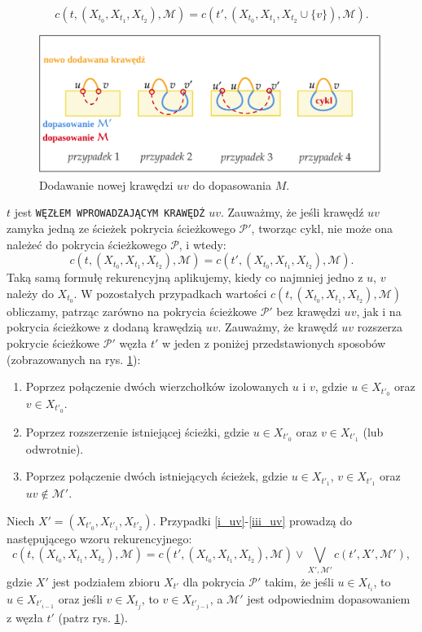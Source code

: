 \documentclass[12pt, oneside]{report}
\begin{document}
$$c(t, (X_{t_0}, X_{t_1}, X_{t_2}), \mathcal{M}) = c(t', (X_{t_0}, X_{t_1}, X_{t_2} \cup \{v\}), \mathcal{M}).$$
\begin{figure}
\centering
\includegraphics[width=16cm]{introduce_edge.png}
\caption{Dodawanie nowej krawędzi $uv$ do dopasowania $M$.}
\label{introduce_edge}
\end{figure}
$t$ jest \texttt{WĘZŁEM WPROWADZAJĄCYM KRAWĘDŹ} $uv$. Zauważmy, że jeśli krawędź $uv$ zamyka jedną ze ścieżek pokrycia ścieżkowego $\mathcal{P}'$, tworząc cykl, nie może ona należeć do pokrycia ścieżkowego $\mathcal{P}$, i wtedy:
$$c(t, (X_{t_0}, X_{t_1}, X_{t_2}), \mathcal{M}) = c(t', (X_{t_0}, X_{t_1}, X_{t_2}), \mathcal{M}).$$
Taką samą formułę rekurencyjną aplikujemy, kiedy co najmniej jedno z $u$, $v$ należy do $X_{t_0}$.  W pozostałych przypadkach wartości $c(t, (X_{t_0}, X_{t_1}, X_{t_2}), \mathcal{M})$ obliczamy, patrząc zarówno na pokrycia ścieżkowe $\mathcal{P}'$ bez krawędzi $uv$, jak i na pokrycia ścieżkowe z dodaną krawędzią $uv$. Zauważmy, że krawędź $uv$ rozszerza pokrycie ścieżkowe $\mathcal{P}'$ węzła $t'$ w jeden z poniżej przedstawionych sposobów (zobrazowanych na rys. \ref{introduce_edge}):
\begin{enumerate}
\item \label{i_uv}Poprzez połączenie dwóch wierzchołków izolowanych $u$ i $v$, gdzie $u \in X_{t'_0}$ oraz $v \in X_{t'_0}$.
\item Poprzez rozszerzenie istniejącej ścieżki, gdzie $u \in X_{t'_0}$ oraz $v \in X_{t'_1}$ (lub odwrotnie).
\item \label{iii_uv}Poprzez połączenie dwóch istniejących ścieżek, gdzie $u \in X_{t'_1}$, $v \in X_{t'_1}$ oraz $uv \notin \mathcal{M}'$.
\end{enumerate}
Niech $X' = (X_{t'_0}, X_{t'_1}, X_{t'_2})$. Przypadki \ref{i_uv}-\ref{iii_uv} prowadzą do następującego wzoru rekurencyjnego:
$$c(t, (X_{t_0}, X_{t_1}, X_{t_2}), \mathcal{M}) =  c(t', (X_{t_0}, X_{t_1}, X_{t_2}), \mathcal{M}) \vee \bigvee \limits_{X', \mathcal{M'}} c(t', X', \mathcal{M}'),$$ gdzie $X'$ jest podziałem zbioru $X_{t'}$ dla pokrycia $\mathcal{P}'$ takim, że jeśli $u \in X_{t_i}$, to $u \in X_{t'_{i-1}}$ oraz jeśli $v \in X_{t_j}$, to $v \in X_{t'_{j-1}}$, a $\mathcal{M}'$ jest odpowiednim dopasowaniem z węzła $t'$ (patrz rys. \ref{introduce_edge}).
\end{document}

